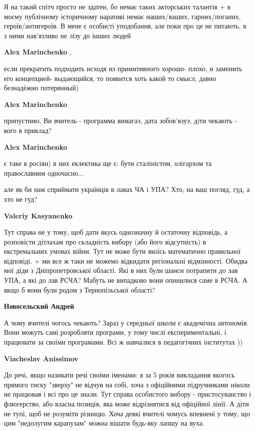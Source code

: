 \begin{itemize}
\begin{itemize}
Я на такий спітч просто не здатен, бо немає таких акторських талантів + в моєму
публічному історичному наративі немає наших/ваших, гарних/поганих,
героїв/антигероїв. В мене є особисті уподобання, але поки про це не питають, я
з ними нав'язливо не лізу до інших людей

\textbf{Alex Marinchenko} , 

если прекратить подходить исходя из примитивного хорошо- плохо, и заменить его
концепцией- выдающийся, то появится хоть какой то смысл, давно безнадёжно
потерянный)

\textbf{Alex Marinchenko} 

припустимо, Ви вчитель - программа вимагаэ, дата зобов'язуэ, дiти чекають -
кого в приклад?

\textbf{Alex Marinchenko} 

є таке в росіян) в них еклектика ще є: бути сталіністом, олігархом та
православним одночасно...

але як би нам сприймати українців в лавах ЧА і УПА? Хто, на ваш погляд, гуд, а
хто не гуд?

\textbf{Valeriy Kasyanenko} 

Тут справа не у тому, щоб дати якусь однозначну й остаточну відповідь, а
розповісти дітлахам про складність вибору (або його відсутність) в
екстремальних умовах війни. Тут не може бути якоїсь математично правильної
відповіді. + ми все ж таки не можемо відкидати регіональні відмінності. Обидва
мої діди з Дніпропетровської області. Які в них були шанси потрапити до лав
УПА, а які до лав РСЧА? Мабуть не випадково вони опинилися саме в РСЧА. А якщо
б вони були родом з Тернопільської області?

\textbf{Новосельский Андрей} 

А чому вчителі чогось чекають? Зараз у середньої школи є академічна автономія.
Вони можуть самі розробляти програми, у тому числі експериментальні, і
працювати за своїми програмами. Всі ж навчалися в педагогічних інститутах ))

\textbf{Viacheslav Anissimov} 

До речі, якщо називати речі своїми іменами: я за 5 років викладання якогось
прямого тиску "зверху" не відчув на собі, хоча з офіційними підручниками ніколи
не працював і всі про це знали. Тут справа особистого вибору - пристосуванство
і флюгерство, або власна позиція, яка може відрізнятися від офіційної лінії. А
діти не тупі, щоб не розуміти різницю. Хоча деякі вчителі чомусь впевнені у
тому, що цим "недолугим карапузам" можна вішати будь-яку лапшу на вуха.


\end{itemize}
\end{itemize}
